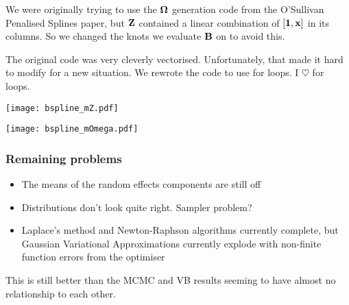\documentclass{beamer}
\begin{document}
\begin{frame}
We were originally  trying to use the ${\boldsymbol \Omega}$ generation code from the O'Sullivan Penalised 
Splines paper, but ${\bf Z}$ contained a linear combination of $[{\bf 1}, {\bf x}]$ in its columns. So 
we changed the knots we evaluate ${\bf B}$ on to avoid this.

The original code was very cleverly vectorised. Unfortunately, that made it hard to modify
for a new situation. We rewrote the code to use for loops. I $\heartsuit$ for loops.
\end{frame}

\begin{frame}
	\texttt{[image: bspline\_mZ.pdf]}
\end{frame}

\begin{frame}
	\texttt{[image: bspline\_mOmega.pdf]}
\end{frame}

\begin{frame}
\frametitle{Remaining problems}
\begin{itemize}
\item The means of the random effects components are still off
\item Distributions don't look quite right. Sampler problem?
\item Laplace's method and Newton-Raphson algorithms currently complete, but
			Gaussian Variational Approximations currently explode with non-finite function
			errors from the optimiser
\end{itemize}

This is still better than the MCMC and VB results seeming to have almost no relationship
to each other.

\end{frame}
\end{document}

